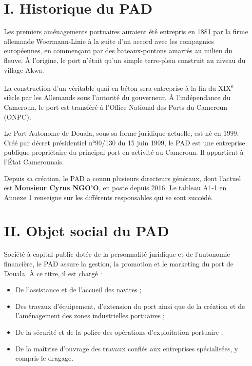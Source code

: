 \documentclass[a4paper,12pt,openany]{report}
\begin{document}
\section*{I. Historique du PAD}

Les premiers aménagements portuaires auraient été entrepris en 1881 par la firme allemande Woermann-Linie à la suite d’un accord avec les compagnies européennes, en commençant par des bateaux-pontons amarrés au milieu du fleuve. À l’origine, le port n’était qu’un simple terre-plein construit au niveau du village Akwa.

La construction d’un véritable quai en béton sera entreprise à la fin du XIX\textsuperscript{e} siècle par les Allemands sous l’autorité du gouverneur. À l’indépendance du Cameroun, le port est transféré à l’Office National des Ports du Cameroun (ONPC).

Le Port Autonome de Douala, sous sa forme juridique actuelle, est né en 1999. Créé par décret présidentiel n°99/130 du 15 juin 1999, le PAD est une entreprise publique propriétaire du principal port en activité au Cameroun. Il appartient à l’État Camerounais.

Depuis sa création, le PAD a connu plusieurs directeurs généraux, dont l’actuel est \textbf{Monsieur Cyrus NGO’O}, en poste depuis 2016. Le tableau A1-1 en Annexe 1 renseigne sur les différents responsables qui se sont succédé.


\section*{II. Objet social du PAD}

Société à capital public dotée de la personnalité juridique et de l’autonomie financière, le PAD assure la gestion, la promotion et le marketing du port de Douala. À ce titre, il est chargé :

\begin{itemize}
	\item De l’assistance et de l’accueil des navires ;
	\item Des travaux d’équipement, d’extension du port ainsi que de la création et de l’aménagement des zones industrielles portuaires ;
	\item De la sécurité et de la police des opérations d’exploitation portuaire ;
	\item De la maîtrise d’ouvrage des travaux confiés aux entreprises spécialisées, y compris le dragage.
\end{itemize}
\end{document}
